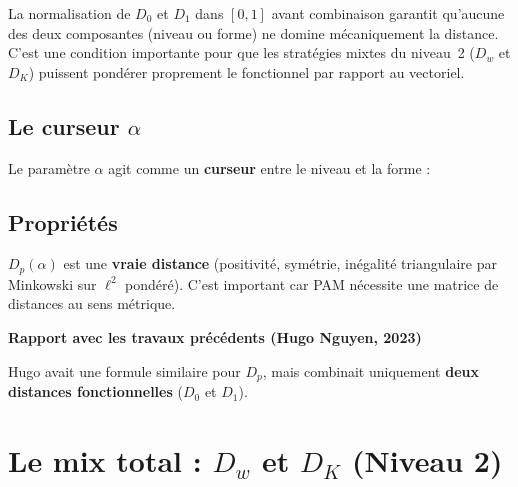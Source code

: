 \documentclass[11pt, a4paper]{article}
\newcommand{\Dp}{D_p}
\newcommand{\Dw}{D_w}
\newcommand{\DK}{D_K}
\newenvironment{keybox}[1][]{%
  \def\FrameCommand{\fboxsep=8pt \fcolorbox{emphborder}{emphbox}}%
  \MakeFramed{\advance\hsize-\width \FrameRestore}%
  \noindent\textbf{#1}\par\smallskip\noindent\ignorespaces
}{\endMakeFramed}
\begin{document}
La normalisation de $D_0$ et $D_1$ dans $[0,1]$ avant combinaison
garantit qu'aucune des deux composantes (niveau ou forme) ne domine
mécaniquement la distance. C'est une condition importante pour que les
stratégies mixtes du niveau~2 ($\Dw$ et $\DK$) puissent pondérer
proprement le fonctionnel par rapport au vectoriel.

\subsection{Le curseur $\alpha$}

Le paramètre $\alpha$ agit comme un \textbf{curseur} entre le niveau
et la forme :

\begin{figure}[H]
\centering
{}
\end{figure}

\subsection{Propriétés}

$\Dp(\alpha)$ est une \textbf{vraie distance} (positivité, symétrie,
inégalité triangulaire par Minkowski sur $\ell^2$ pondéré). C'est important
car PAM nécessite une matrice de distances au sens métrique.

\begin{keybox}[Rapport avec les travaux précédents (Hugo Nguyen, 2023)]
Hugo avait une formule similaire pour $\Dp$, mais combinait uniquement
\textbf{deux distances fonctionnelles} ($D_0$ et $D_1$).
\end{keybox}

\newpage
\section{Le mix total : $\Dw$ et $\DK$ (Niveau 2)}
\end{document}
